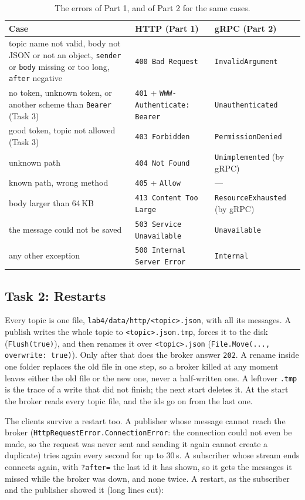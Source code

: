 \documentclass[11pt,a4paper]{article}
\newcommand{\code}[1]{{\frenchspacing\texttt{#1}}}
\begin{document}
\begin{table}[H]
\centering\small
\caption{The errors of Part 1, and of Part 2 for the same cases.}\label{tab:errors}
\begin{tabularx}{\linewidth}{@{}Xll@{}}
\toprule
Case & HTTP (Part 1) & gRPC (Part 2) \\
\midrule
topic name not valid, body not JSON or not an object, \code{sender} or \code{body} missing or too long, \code{after} negative & \code{400 Bad Request} & \code{InvalidArgument} \\
no token, unknown token, or another scheme than \code{Bearer} (Task 3) & \code{401} + \code{WWW-Authenticate: Bearer} & \code{Unauthenticated} \\
good token, topic not allowed (Task 3) & \code{403 Forbidden} & \code{PermissionDenied} \\
unknown path & \code{404 Not Found} & \code{Unimplemented} (by gRPC) \\
known path, wrong method & \code{405} + \code{Allow} & --- \\
body larger than 64\,KB & \code{413 Content Too Large} & \code{ResourceExhausted} (by gRPC) \\
the message could not be saved & \code{503 Service Unavailable} & \code{Unavailable} \\
any other exception & \code{500 Internal Server Error} & \code{Internal} \\
\bottomrule
\end{tabularx}
\end{table}

\subsection{Task 2: Restarts}

Every topic is one file, \code{lab4/data/http/<topic>.json}, with all its messages. A publish
writes the whole topic to \code{<topic>.json.tmp}, forces it to the disk (\code{Flush(true)}), and
then renames it over \code{<topic>.json} (\code{File.Move(..., overwrite: true)}). Only after that
does the broker answer \code{202}. A rename inside one folder replaces the old file in one step, so a
broker killed at any moment leaves either the old file or the new one, never a half-written one. A
leftover \code{.tmp} is the trace of a write that did not finish; the next start deletes it. At the
start the broker reads every topic file, and the ids go on from the last one.

The clients survive a restart too. A publisher whose message cannot reach the broker
(\code{HttpRequestError.ConnectionError}: the connection could not even be made, so the request was
never sent and sending it again cannot create a duplicate) tries again every second for up to 30\,s.
A subscriber whose stream ends connects again, with \code{?after=} the last id it has shown, so it
gets the messages it missed while the broker was down, and none twice. A restart, as the subscriber
and the publisher showed it (long lines cut):
\end{document}
